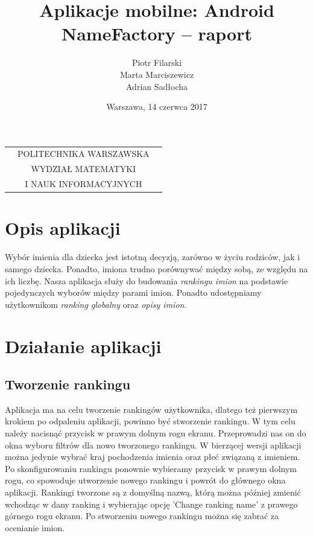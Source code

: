 \documentclass[12pt,a4paper]{article}
\begin{document}
\begin{table}[t]
\centering
\begin{tabular}[t]{lcr}
& POLITECHNIKA WARSZAWSKA & \\
& WYDZIAŁ MATEMATYKI & \\
& I NAUK INFORMACYJNYCH &
\end{tabular}
\end{table}

\author{Piotr Filarski \\ Marta Marciszewicz \\ Adrian Sadłocha}
\title{Aplikacje mobilne: Android \\ NameFactory -- raport}
\date{Warszawa, 14 czerwca 2017}

\maketitle

\section*{Opis aplikacji}
Wybór imienia dla dziecka jest istotną decyzją, zarówno w życiu rodziców, jak i samego dziecka.
Ponadto, imiona trudno porównywać między sobą, ze względu na ich liczbę.
Nasza aplikacja służy do budowania \textit{rankingu imion} na podstawie pojedynczych wyborów między parami imion.
Ponadto udostępniamy użytkownikom \textit{ranking globalny} oraz \textit{opisy imion}.
\newpage

\section{Działanie aplikacji}
\subsection{Tworzenie rankingu}

Aplikacja ma na celu tworzenie rankingów użytkownika, dlatego też pierwszym krokiem po odpaleniu aplikacji, powinno być stworzenie rankingu. W tym celu należy nacisnąć przycisk w prawym dolnym rogu ekranu. Przeprowadzi nas on do okna wyboru filtrów dla nowo tworzonego rankingu. W bierzącej wersji aplikacji można jedynie wybrać kraj pochodzenia imienia oraz płeć związaną z imieniem. 
Po skonfigurowaniu rankingu ponownie wybieramy przycisk w prawym dolnym rogu, co spowoduje utworzenie nowego rankingu i powrót do głównego okna aplikacji. Rankingi tworzone są z domyślną nazwą, którą można później zmienić wchodząc w dany ranking i wybierając opcję 'Change ranking name' z prawego górnego rogu ekranu. 
Po stworzeniu nowego rankingu można się zabrać za ocenianie imion.
\end{document}
